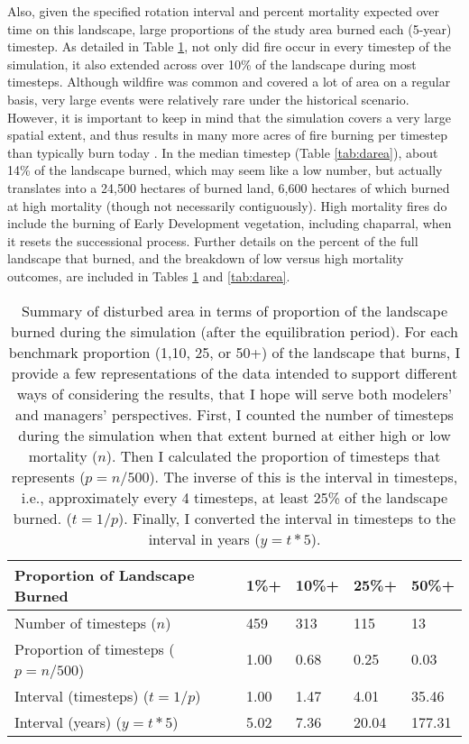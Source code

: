 Also, given the specified rotation interval and percent mortality expected over time on this landscape, large proportions of the study area burned each (5-year) timestep. As detailed in Table \ref{tab:darea_atleast}, not only did fire occur in every timestep of the simulation, it also extended across over 10\% of the landscape during most timesteps. Although wildfire was common and covered a lot of area on a regular basis, very large events were relatively rare under the historical scenario. However, it is important to keep in mind that the simulation covers a very large spatial extent, and thus results in many more acres of fire burning per timestep than typically burn today \citep{calfire2012,usgs-fire-data2012}. In the median timestep (Table \ref{tab:darea}), about 14\% of the landscape burned, which may seem like a low number, but actually translates into a 24,500 hectares of burned land, 6,600 hectares of which burned at high mortality (though not necessarily contiguously). High mortality fires do include the burning of Early Development vegetation, including chaparral, when it resets the successional process. Further details on the percent of the full landscape that burned, and the breakdown of low versus high mortality outcomes, are included in Tables \ref{tab:darea_atleast} and \ref{tab:darea}.

\begin{table}[!htbp]
\footnotesize
\centering
\caption{Summary of disturbed area in terms of proportion of the landscape burned during the simulation (after the equilibration period). For each benchmark proportion (1,10, 25, or 50+) of the landscape that burns, I provide a few representations of the data intended to support different ways of considering the results, that I hope will serve both modelers' and managers' perspectives. First, I counted the number of timesteps during the simulation when that extent burned at either high or low mortality ($n$). Then I calculated the proportion of timesteps that represents ($p = n/500$). The inverse of this is the interval in timesteps, i.e., approximately every 4 timesteps, at least 25\% of the landscape burned. ($t = 1/p$). Finally, I converted the interval in timesteps to the interval in years ($y = t * 5$).}
\label{tab:darea_atleast}
\begin{tabular}{@{}lllll@{}}
\toprule
\textbf{Proportion of Landscape Burned} & \textbf{1\%+}     & \textbf{10\%+}    & \textbf{25\%+}    & \textbf{50\%+} \\ \midrule
Number of timesteps ($n$)        & 459              & 313              & 115              & 13            \\
Proportion of timesteps ($p = n/500$)    & 1.00             & 0.68             & 0.25             & 0.03          \\
Interval (timesteps) ($t = 1/p$)      & 1.00             & 1.47             & 4.01             & 35.46         \\
Interval (years)    ($y = t * 5$)       & 5.02             & 7.36             & 20.04            & 177.31        \\ \bottomrule
\end{tabular}
\end{table}

